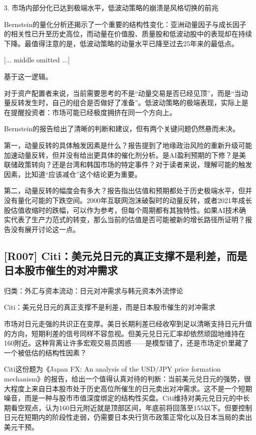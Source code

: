 \documentclass[11pt]{ctexart}
\begin{document}
3. 市场内部分化已达到极端水平，低波动策略的崩溃是风格切换的前兆

Bernstein的量化分析还揭示了一个重要的结构性变化：亚洲动量因子与成长因子的相关性已升至历史高位，而动量在价值股、质量股和低波动股中的表现却在持续下降。最值得注意的是，低波动策略的动量水平已降至过去25年来的最低点。

[... middle omitted ...]

基于这一逻辑。

对于资产配置者来说，当前需要思考的不是“动量交易是否已经见顶”，而是“当动量反转发生时，自己的组合是否做好了准备”。低波动策略的极端表现，实际上是在提醒投资者：市场可能已经极度拥挤在同一个方向上。

Bernstein的报告给出了清晰的判断和建议，但有两个关键问题仍然悬而未决。

第一，动量反转的具体触发因素是什么？报告提到了地缘政治风险的重新升级可能加速动量反转，但并没有给出更具体的催化剂分析。是AI盈利预期的下修？是美联储政策转向？还是台湾和韩国市场的特定事件？对于读者来说，理解可能的触发因素，比知道“应该减仓”这个结论更为重要。

第二，动量反转的幅度会有多大？报告指出估值和预期都处于历史极端水平，但并没有量化可能的下跌空间。2000年互联网泡沫破裂时的动量反转，或者2021年成长股估值收缩时的跌幅，可以作为参考，但每个周期都有其独特性。如果AI技术确实代表了生产力范式的转变，那么当前的估值是否可能被新的增长路径所证明？报告没有展开讨论这一点。

\subsection{[R007] Citi：美元兑日元的真正支撑不是利差，而是日本股市催生的对冲需求}
{\small\color{refgray}归类：外汇与资本流动：日元对冲需求与韩元资本外流悖论}

Citi：美元兑日元的真正支撑不是利差，而是日本股市催生的对冲需求

市场对日元走强的共识正在变厚。美日长期利差已经收窄到足以清晰支持日元升值的方向，短期利差的信号同样不容忽视。但美元兑日元汇率却依然顽固地维持在160附近。这种背离让许多宏观交易员困惑——是模型错了，还是市场定价里藏了一个被低估的结构性因素？

Citi这份题为《Japan FX: An analysis of the USD/JPY price formation mechanism》的报告，给出一个值得认真对待的判断：当前美元兑日元的强势，很大程度上来自日本股市处于历史高位所催生的日元卖出对冲需求。这不是一个短期噪音，而是一种与股市市值深度绑定的结构性买盘。Citi维持对美元兑日元的中长期看空观点，认为160日元附近就是顶部区间，年底前将回落至155以下。但要控制日元在短期内的阶段性走弱，仍需要日本央行货币政策正常化以及日本当局的卖出美元干预。
\end{document}
